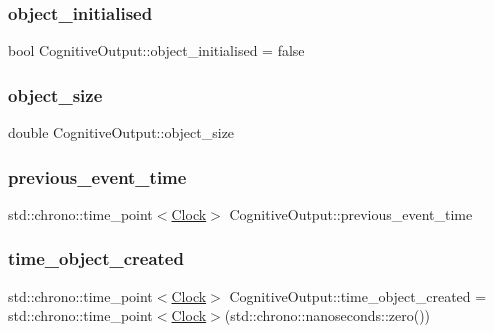 \subsubsection{\texorpdfstring{object\+\_\+initialised}{object\_initialised}}
{\footnotesize\ttfamily bool Cognitive\+Output\+::object\+\_\+initialised = false\hspace{0.3cm}{\ttfamily [private]}}

\mbox{\label{classCognitiveOutput_ac1bfcefdc6ddd280d3728dd7804dbf1f}} 
\subsubsection{\texorpdfstring{object\+\_\+size}{object\_size}}
{\footnotesize\ttfamily double Cognitive\+Output\+::object\+\_\+size\hspace{0.3cm}{\ttfamily [private]}}

\mbox{\label{classCognitiveOutput_a68908403a0b612166f4a792b9203bf5e}} 
\subsubsection{\texorpdfstring{previous\+\_\+event\+\_\+time}{previous\_event\_time}}
{\footnotesize\ttfamily std\+::chrono\+::time\+\_\+point$<$\mbox{\hyperlink{universe_8h_a0ef8d951d1ca5ab3cfaf7ab4c7a6fd80}{Clock}}$>$ Cognitive\+Output\+::previous\+\_\+event\+\_\+time\hspace{0.3cm}{\ttfamily [private]}}

\mbox{\label{classCognitiveOutput_abc217a60acde159374e7a963d41e7958}} 
\subsubsection{\texorpdfstring{time\+\_\+object\+\_\+created}{time\_object\_created}}
{\footnotesize\ttfamily std\+::chrono\+::time\+\_\+point$<$\mbox{\hyperlink{universe_8h_a0ef8d951d1ca5ab3cfaf7ab4c7a6fd80}{Clock}}$>$ Cognitive\+Output\+::time\+\_\+object\+\_\+created = std\+::chrono\+::time\+\_\+point$<$\mbox{\hyperlink{universe_8h_a0ef8d951d1ca5ab3cfaf7ab4c7a6fd80}{Clock}}$>$(std\+::chrono\+::nanoseconds\+::zero())\hspace{0.3cm}{\ttfamily [private]}}



